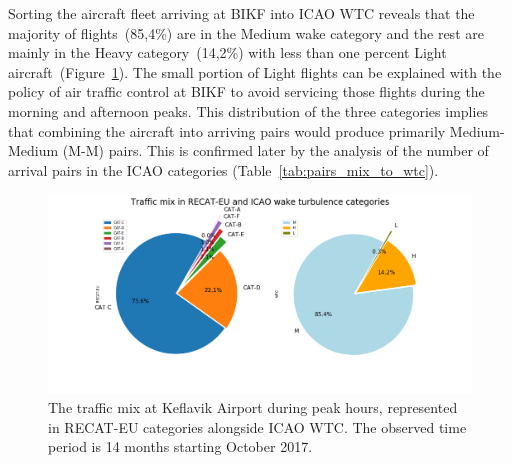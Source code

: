 \begin{table}[h]
\centering
{}
\caption[Transition from ICAO WTC to RECAT-EU categories]{Transition from ICAO WTC to RECAT-EU categories. CAT-C combines aircraft from the ICAO Heavy and Medium categories and CAT-F combines aircraft from the Medium and Light categories. The categorisation process and criteria for assigning an existing aircraft type into RECAT-EU scheme is illustrated in detail in Figure~\ref{fig:RECAT_criteria}.}
\label{tab:wtc2recat_division}
\end{table}

Sorting the aircraft fleet arriving at BIKF into ICAO WTC reveals that the majority of flights~(85,4\%) are in the Medium wake category and the rest are mainly in the Heavy category~(14,2\%) with less than one percent Light aircraft~(Figure~\ref{fig:post_fast_exit_mix_pie_v2}). The small portion of Light flights can be explained with the policy of air traffic control at BIKF to avoid servicing those flights during the morning and afternoon peaks. This distribution of the three categories implies that combining the aircraft into arriving pairs would produce primarily Medium-Medium (M-M) pairs. This is confirmed later by the analysis of the number of arrival pairs in the ICAO categories (Table~\ref{tab:pairs_mix_to_wtc}).

\begin{figure}[h]
    \centering
    \includegraphics[width=1\textwidth]{graphics/fig_post_fast_exit_mix_pie_v2.png}
    \caption[Traffic mix in RECAT-EU and ICAO WTC]{The traffic mix at Keflavik Airport during peak hours, represented in RECAT-EU categories alongside ICAO WTC. The observed time period is 14 months starting October 2017.}
    \label{fig:post_fast_exit_mix_pie_v2}
\end{figure}

